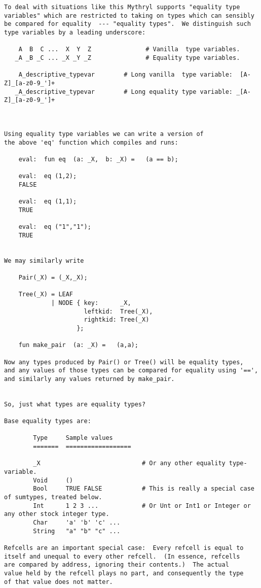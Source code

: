 \begin{verbatim}
To deal with situations like this Mythryl supports "equality type 
variables" which are restricted to taking on types which can sensibly 
be compared for equality  --- "equality types".  We distinguish such 
type variables by a leading underscore: 

    A  B  C ...  X  Y  Z               # Vanilla  type variables. 
   _A _B _C ... _X _Y _Z               # Equality type variables.  

    A_descriptive_typevar        # Long vanilla  type variable:  [A-Z]_[a-z0-9_']+ 
   _A_descriptive_typevar        # Long equality type variable: _[A-Z]_[a-z0-9_']+ 



Using equality type variables we can write a version of 
the above 'eq' function which compiles and runs: 

    eval:  fun eq  (a: _X,  b: _X) =   (a == b);  

    eval:  eq (1,2);  
    FALSE 

    eval:  eq (1,1); 
    TRUE 

    eval:  eq ("1","1"); 
    TRUE 


We may similarly write 

    Pair(_X) = (_X,_X); 

    Tree(_X) = LEAF 
             | NODE { key:      _X, 
                      leftkid:  Tree(_X), 
                      rightkid: Tree(_X) 
                    }; 

    fun make_pair  (a: _X) =   (a,a); 

Now any types produced by Pair() or Tree() will be equality types, 
and any values of those types can be compared for equality using '==', 
and similarly any values returned by make_pair. 


So, just what types are equality types? 

Base equality types are: 

        Type     Sample values 
        =======  ==================  

        _X                            # Or any other equality type-variable. 
        Void     ()   
        Bool     TRUE FALSE           # This is really a special case of sumtypes, treated below. 
        Int      1 2 3 ...            # Or Unt or Int1 or Integer or any other stock integer type. 
        Char     'a' 'b' 'c' ...   
        String   "a" "b" "c" ...   
 
Refcells are an important special case:  Every refcell is equal to 
itself and unequal to every other refcell.  (In essence, refcells 
are compared by address, ignoring their contents.)  The actual 
value held by the refcell plays no part, and consequently the type 
of that value does not matter. 


\end{verbatim}
